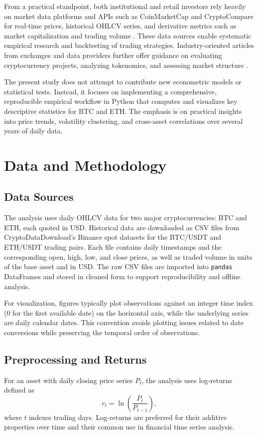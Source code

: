 \documentclass[conference]{IEEEtran}
\begin{document}
From a practical standpoint, both institutional and retail investors rely heavily on market data platforms and APIs such as CoinMarketCap and CryptoCompare for real-time prices, historical OHLCV series, and derivative metrics such as market capitalization and trading volume \cite{coinmarketcapAPI,cryptocompareAPI}. These data sources enable systematic empirical research and backtesting of trading strategies. Industry-oriented articles from exchanges and data providers further offer guidance on evaluating cryptocurrency projects, analyzing tokenomics, and assessing market structure \cite{fidelityEvaluation,nbxEvaluation}. 

The present study does not attempt to contribute new econometric models or statistical tests. Instead, it focuses on implementing a comprehensive, reproducible empirical workflow in Python that computes and visualizes key descriptive statistics for BTC and ETH. The emphasis is on practical insights into price trends, volatility clustering, and cross-asset correlations over several years of daily data.

\section{Data and Methodology}
\label{sec:data_method}

\subsection{Data Sources}
The analysis uses daily OHLCV data for two major cryptocurrencies: BTC and ETH, each quoted in USD. Historical data are downloaded as CSV files from CryptoDataDownload's Binance spot datasets for the BTC/USDT and ETH/USDT trading pairs.\cite{cryptodatadownload} Each file contains daily timestamps and the corresponding open, high, low, and close prices, as well as traded volume in units of the base asset and in USD. The raw CSV files are imported into \texttt{pandas} DataFrames and stored in cleaned form to support reproducibility and offline analysis.

For visualization, figures typically plot observations against an integer time index (0 for the first available date) on the horizontal axis, while the underlying series are daily calendar dates. This convention avoids plotting issues related to date conversions while preserving the temporal order of observations.

\subsection{Preprocessing and Returns}
For an asset with daily closing price series \(P_t\), the analysis uses log-returns defined as
\[
r_t = \ln\left(\frac{P_t}{P_{t-1}}\right),
\]
where \(t\) indexes trading days. Log-returns are preferred for their additive properties over time and their common use in financial time series analysis.
\end{document}
